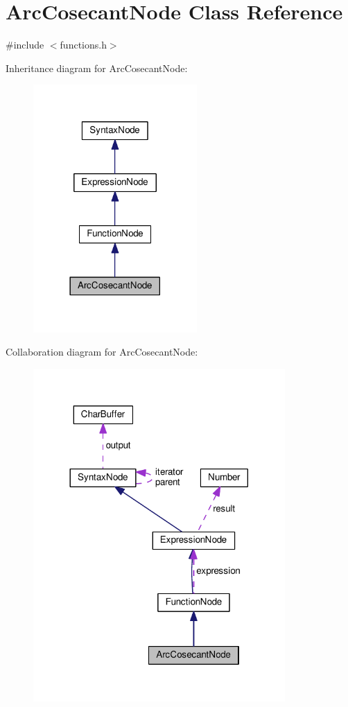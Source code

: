 \hypertarget{classArcCosecantNode}{}\section{Arc\+Cosecant\+Node Class Reference}
\label{classArcCosecantNode}


{\ttfamily \#include $<$functions.\+h$>$}



Inheritance diagram for Arc\+Cosecant\+Node\+:\nopagebreak
\begin{figure}[H]
\begin{center}
\leavevmode
\includegraphics[width=177pt]{classArcCosecantNode__inherit__graph}
\end{center}
\end{figure}


Collaboration diagram for Arc\+Cosecant\+Node\+:\nopagebreak
\begin{figure}[H]
\begin{center}
\leavevmode
\includegraphics[width=272pt]{classArcCosecantNode__coll__graph}
\end{center}
\end{figure}
